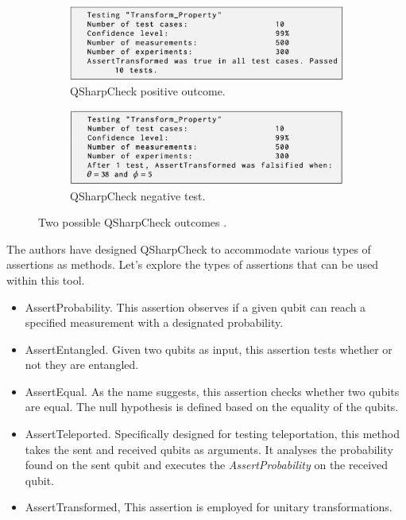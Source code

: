 \begin{itemize}
\begin{figure}[H]
    \centering
    \begin{subfigure}[H]{0.48\textwidth}
        \centering
        \includegraphics[width=\textwidth]{TFM/photos/QSharpOut1.png}
        \caption{QSharpCheck positive outcome.} 
        \label{Fig:QSharpOutput1}
    \end{subfigure}
    \hfill
    \begin{subfigure}[H]{0.48\textwidth}
        \centering
        \includegraphics[width=\textwidth]{TFM/photos/Qsharpout2.png}
        \caption{QSharpCheck negative test.} 
        \label{Fig:QSharpOutput2}
    \end{subfigure}
        \caption{Two possible QSharpCheck outcomes \cite{honarvar2020property}. }
    \label{FIG:QSharpOutput}
 \end{figure}

The authors have designed QSharpCheck to accommodate various types of assertions as methods. Let's explore the types of assertions that can be used within this tool.

\begin{itemize}
    \item AssertProbability. This assertion observes if a given qubit can reach a specified measurement with a designated probability.
    \item AssertEntangled. Given two qubits as input, this assertion tests whether or not they are entangled.
    \item AssertEqual. As the name suggests, this assertion checks whether two qubits are equal. The null hypothesis is defined based on the equality of the qubits.
    \item AssertTeleported. Specifically designed for testing teleportation, this method takes the sent and received qubits as arguments. It analyses the probability found on the sent qubit and executes the \textit{AssertProbability} on the received qubit.
    \item AssertTransformed, This assertion is employed for unitary transformations.
\end{itemize}


\end{itemize}
